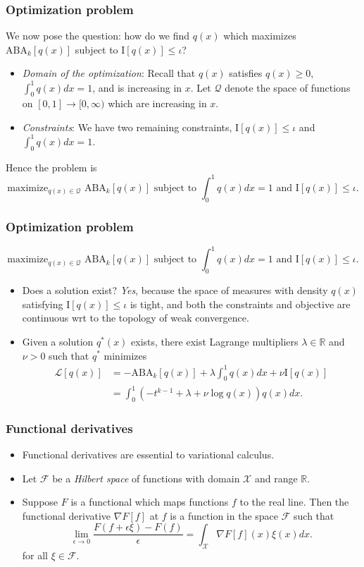 \documentclass{beamer}
\begin{document}
\begin{frame}
\frametitle{Optimization problem}
We now pose the question: how do we find $q(x)$ which maximizes $\text{ABA}_k[q(x)]$ subject to $\text{I}[q(x)] \leq \iota$?

\begin{itemize}
\item \emph{Domain of the optimization}: Recall that $q(x)$ satisfies $q(x) \geq 0$, $\int_0^1 q(x) dx = 1$, and is increasing in $x$.
Let $\mathcal{Q}$ denote the space of functions on $[0,1] \to [0,\infty)$ which are increasing in $x$.
\item \emph{Constraints}: We have two remaining constraints, $\text{I}[q(x)] \leq \iota$ and $\int_0^1 q(x) dx = 1$.
\end{itemize}

Hence the problem is
\[
\text{maximize}_{q(x) \in \mathcal{Q}}\text{ ABA}_k[q(x)]\text{ subject to }\int_0^1 q(x) dx = 1\text{ and }\text{I}[q(x)] \leq \iota.
\]
\end{frame}

\begin{frame}
\frametitle{Optimization problem}
\[
\text{maximize}_{q(x) \in \mathcal{Q}}\text{ ABA}_k[q(x)]\text{ subject to }\int_0^1 q(x) dx = 1\text{ and }\text{I}[q(x)] \leq \iota.
\]
\begin{itemize}
\item Does a solution exist? \emph{Yes}, because the space of measures
  with density $q(x)$ satisfying $\text{I}[q(x)] \leq \iota$ is tight,
  and both the constraints and objective are continuous wrt to the
  topology of weak convergence.
\item Given a solution $q^*(x)$ exists, there exist Lagrange multipliers $\lambda \in \mathbb{R}$ and $\nu > 0$ such that $q^*$ minimizes
\begin{align*}
\mathcal{L}[q(x)] &= -\text{ABA}_k[q(x)] + \lambda \int_0^1 q(x) dx + \nu \text{I}[q(x)]
\\&= \int_0^1 (-t^{k-1} + \lambda + \nu \log q(x)) q(x) dx.
\end{align*}
\end{itemize}

\end{frame}

\begin{frame}
\frametitle{Functional derivatives}
\begin{itemize}
\item Functional derivatives are essential to variational calculus.
\item Let $\mathcal{F}$ be a \emph{Hilbert space} of functions with domain $\mathcal{X}$ and range $\mathbb{R}$.
\item Suppose $F$ is a functional which maps functions $f$ to the real line.
Then the functional derivative $\nabla F[f]$ at $f$ is a function in the space $\mathcal{F}$ such that
\[
\lim_{\epsilon \to 0}\frac{F(f + \epsilon \xi) - F(f)}{\epsilon} = \int_{\mathcal{X}} \nabla F[f](x) \xi(x) dx.
\]
for all $\xi \in \mathcal{F}$.
\end{itemize}
\end{frame}
\end{document}
